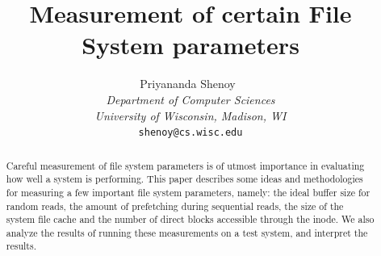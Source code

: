 \documentclass[twocolumn,11pt]{article}
\title{\bf \textsf{Measurement of certain File System parameters}}
\author{Priyananda Shenoy\
\\
       {\em \normalsize Department of Computer Sciences}\\
       {\em \normalsize University of Wisconsin, Madison, WI}\\
       {\tt \normalsize shenoy@cs.wisc.edu}}
\begin{document}
\date{}
\raggedbottom

\maketitle

\pagestyle{plain}
\setlength{\footskip}{25pt}

\begin{abstract}
\small
Careful measurement of file system parameters is of utmost importance in
evaluating how well a system is performing. This paper describes some ideas
and methodologies for measuring a few important file system parameters, namely:
the ideal buffer size for random reads, the amount of prefetching during
sequential reads, the size of the system file cache and the number of direct
blocks accessible through the inode. We also analyze the results of running
these measurements on a test system, and interpret the results.
\end{abstract}
\end{document}
